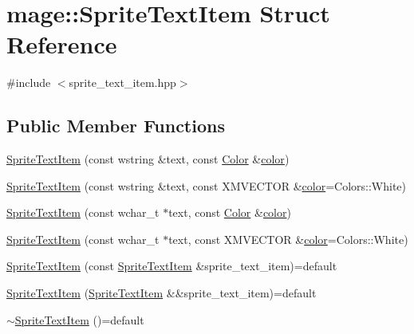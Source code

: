 \hypertarget{structmage_1_1_sprite_text_item}{}\section{mage\+:\+:Sprite\+Text\+Item Struct Reference}
\label{structmage_1_1_sprite_text_item}


{\ttfamily \#include $<$sprite\+\_\+text\+\_\+item.\+hpp$>$}

\subsection*{Public Member Functions}
\begin{DoxyCompactItemize}
\item 
\hyperlink{structmage_1_1_sprite_text_item_a887e1db9520a6d08e77c554a863dfd47}{Sprite\+Text\+Item} (const wstring \&text, const \hyperlink{structmage_1_1_color}{Color} \&\hyperlink{namespacemage_a56eceea5a9bceb2b56073f3ea4945781}{color})
\item 
\hyperlink{structmage_1_1_sprite_text_item_a127d499a50f0dd11b3e3b6598f4b2088}{Sprite\+Text\+Item} (const wstring \&text, const X\+M\+V\+E\+C\+T\+OR \&\hyperlink{namespacemage_a56eceea5a9bceb2b56073f3ea4945781}{color}=Colors\+::\+White)
\item 
\hyperlink{structmage_1_1_sprite_text_item_a561fe95a1dc7460c541eb456dc5fe599}{Sprite\+Text\+Item} (const wchar\+\_\+t $\ast$text, const \hyperlink{structmage_1_1_color}{Color} \&\hyperlink{namespacemage_a56eceea5a9bceb2b56073f3ea4945781}{color})
\item 
\hyperlink{structmage_1_1_sprite_text_item_ac8d85cc26000205cfaf4c830cc02b0b9}{Sprite\+Text\+Item} (const wchar\+\_\+t $\ast$text, const X\+M\+V\+E\+C\+T\+OR \&\hyperlink{namespacemage_a56eceea5a9bceb2b56073f3ea4945781}{color}=Colors\+::\+White)
\item 
\hyperlink{structmage_1_1_sprite_text_item_ae5cbffcab97065bb719aafda3dd4ab5d}{Sprite\+Text\+Item} (const \hyperlink{structmage_1_1_sprite_text_item}{Sprite\+Text\+Item} \&sprite\+\_\+text\+\_\+item)=default
\item 
\hyperlink{structmage_1_1_sprite_text_item_a63f6da078daaf11e0412ab242eb233ee}{Sprite\+Text\+Item} (\hyperlink{structmage_1_1_sprite_text_item}{Sprite\+Text\+Item} \&\&sprite\+\_\+text\+\_\+item)=default
\item 
\hyperlink{structmage_1_1_sprite_text_item_a7e130ad6ffd67a6bae97cae676c6bbb0}{$\sim$\+Sprite\+Text\+Item} ()=default
\item 

\end{DoxyCompactItemize}
